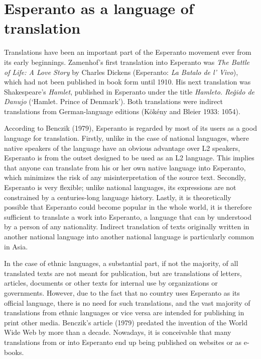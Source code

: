 \section{Esperanto as a language of translation} \label{esperanto_translations}
Translations have been an important part of the Esperanto movement ever from its early beginnings.
Zamenhof's first translation into Esperanto was \textit{The Battle of Life: A Love Story} by Charles Dickens (Esperanto: \textit{La Batalo de l' Vivo}), which had not been published in book form until 1910.
His next translation was Shakespeare's \textit{Hamlet}, published in Esperanto under the title \textit{Hamleto. Reĝido de Danujo} (`Hamlet. Prince of Denmark').
Both translations were indirect translations from German-language editions
(Kökény and Bleier 1933: 1054).

According to Benczik (1979), Esperanto is regarded by most of its users as a good language for translation.
Firstly, unlike in the case of national languages, where native speakers of the language have an obvious advantage over L2 speakers, Esperanto is from the outset designed to be used as an L2 language.
This implies that anyone can translate from his or her own native language into Esperanto, which minimizes the risk of any misinterpretation of the source text.
Secondly, Esperanto is very flexible; unlike national languages, its expressions are not constrained by a centuries-long language history.
Lastly, it is theoretically possible that Esperanto could become popular in the whole world, it is therefore sufficient to translate a work into Esperanto, a language that can by understood by a person of any nationality.
Indirect translation of texts originally written in another national language into another national language is particularly common in Asia.

In the case of ethnic languages, a substantial part, if not the majority, of all translated texts are not meant for publication, but are translations of letters, articles, documents or other texts for internal use by organizations or governments.
However, due to the fact that no country uses Esperanto as its official language, there is no need for such translations, and the vast majority of translations from ethnic languages or vice versa are intended for publishing in print other media.
Benczik's article (1979) predated the invention of the World Wide Web by more than a decade.
Nowadays, it is conceivable that many translations from or into Esperanto end up being published on websites or as e-books.

